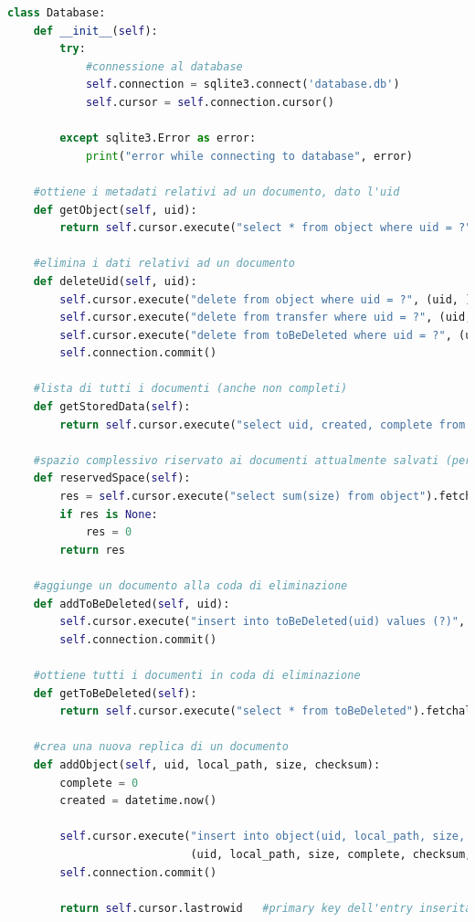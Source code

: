 \documentclass[11pt,a4paper,english]{article}
\begin{document}
\begin{lstlisting}[language=Python, title=Codice]
class Database:
    def __init__(self):
        try:
            #connessione al database
            self.connection = sqlite3.connect('database.db')
            self.cursor = self.connection.cursor()

        except sqlite3.Error as error:
            print("error while connecting to database", error)

    #ottiene i metadati relativi ad un documento, dato l'uid
    def getObject(self, uid):
        return self.cursor.execute("select * from object where uid = ?", (str(uid), )).fetchone()

    #elimina i dati relativi ad un documento
    def deleteUid(self, uid):
        self.cursor.execute("delete from object where uid = ?", (uid, ))
        self.cursor.execute("delete from transfer where uid = ?", (uid, ))
        self.cursor.execute("delete from toBeDeleted where uid = ?", (uid, ))
        self.connection.commit()

    #lista di tutti i documenti (anche non completi)
    def getStoredData(self):
        return self.cursor.execute("select uid, created, complete from object").fetchall()

    #spazio complessivo riservato ai documenti attualmente salvati (per i documenti parziali si conta comunque la dimensione totale)
    def reservedSpace(self):
        res = self.cursor.execute("select sum(size) from object").fetchone()[0]
        if res is None:
            res = 0
        return res

    #aggiunge un documento alla coda di eliminazione
    def addToBeDeleted(self, uid):
        self.cursor.execute("insert into toBeDeleted(uid) values (?)", (uid, ))
        self.connection.commit()

    #ottiene tutti i documenti in coda di eliminazione
    def getToBeDeleted(self):
        return self.cursor.execute("select * from toBeDeleted").fetchall()

    #crea una nuova replica di un documento
    def addObject(self, uid, local_path, size, checksum):
        complete = 0
        created = datetime.now()

        self.cursor.execute("insert into object(uid, local_path, size, complete, checksum, created) values (?, ?, ?, ?, ?, ?)",
                            (uid, local_path, size, complete, checksum, created))
        self.connection.commit()

        return self.cursor.lastrowid   #primary key dell'entry inserita


\end{lstlisting}
\end{document}
